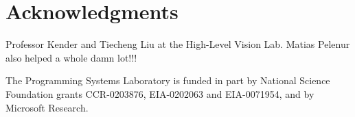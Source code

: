 \documentclass{sig-alternate}
\begin{document}
\section{Acknowledgments}
Professor Kender and Tiecheng Liu at the High-Level Vision Lab.
Matias Pelenur also helped a whole damn lot!!!

The Programming Systems Laboratory is funded in part by National
Science Foundation grants CCR-0203876, EIA-0202063 and EIA-0071954,
and by Microsoft Research.





% 


\balancecolumns %
\end{document}

